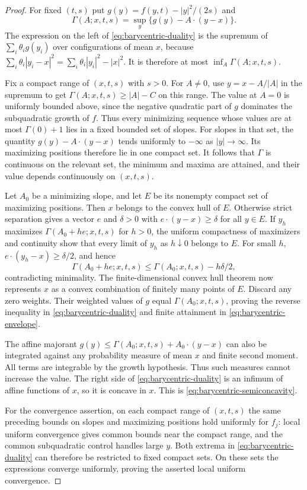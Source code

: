 \documentclass[11pt]{article}
\numberwithin{equation}{section}
\theoremstyle{definition}
\theoremstyle{remark}
\begin{document}
\begin{proof}
For fixed $(t,s)$ put $g(y)=f(y,t)-|y|^2/(2s)$ and
\[
  \Gamma(A;x,t,s)=\sup_y\{g(y)-A\cdot(y-x)\}.
\]
The expression on the left of \eqref{eq:barycentric-duality}
is the supremum of $\sum_i\theta_i g(y_i)$ over configurations
of mean $x$, because
$\sum_i\theta_i|y_i-x|^2=\sum_i\theta_i|y_i|^2-|x|^2$.
It is therefore at most $\inf_A\Gamma(A;x,t,s)$.

Fix a compact range of $(x,t,s)$ with $s>0$. For $A\ne0$, use
$y=x-A/|A|$ in the supremum to get
$\Gamma(A;x,t,s)\ge |A|-C$ on this range. The value at $A=0$
is uniformly bounded above, since the negative quadratic part
of $g$ dominates the subquadratic growth of $f$. Thus every
minimizing sequence whose values are at most $\Gamma(0)+1$
lies in a fixed bounded set of slopes.
For slopes in that set, the quantity
$g(y)-A\cdot(y-x)$ tends uniformly to $-\infty$ as
$|y|\to\infty$. Its maximizing positions therefore lie in one
compact set. It follows that $\Gamma$ is continuous on the
relevant set, the minimum and maxima are attained, and their
value depends continuously on $(x,t,s)$.

Let $A_0$ be a minimizing slope, and let $E$ be its nonempty
compact set of maximizing positions. Then $x$ belongs to the
convex hull of $E$. Otherwise strict separation gives a vector
$e$ and $\delta>0$ with
$e\cdot(y-x)\ge\delta$ for all $y\in E$. If $y_h$ maximizes
$\Gamma(A_0+he;x,t,s)$ for $h>0$, the uniform compactness of
maximizers and continuity show that every limit of $y_h$ as
$h\downarrow0$ belongs to $E$. For small $h$,
$e\cdot(y_h-x)\ge\delta/2$, and hence
\[
  \Gamma(A_0+he;x,t,s)
   \le\Gamma(A_0;x,t,s)-h\delta/2,
\]
contradicting minimality. The finite-dimensional convex hull
theorem now represents $x$ as a convex combination of finitely
many points of $E$. Discard any zero weights. Their weighted
values of $g$ equal $\Gamma(A_0;x,t,s)$, proving the reverse
inequality in \eqref{eq:barycentric-duality} and finite
attainment in \eqref{eq:barycentric-envelope}.

The affine majorant
$g(y)\le\Gamma(A_0;x,t,s)+A_0\cdot(y-x)$ can also be
integrated against any probability measure of mean $x$ and
finite second moment. All terms are integrable by the growth
hypothesis. Thus such measures cannot increase the value.
The right side of \eqref{eq:barycentric-duality} is an infimum
of affine functions of $x$, so it is concave in $x$. This is
\eqref{eq:barycentric-semiconcavity}.

For the convergence assertion, on each compact range of
$(x,t,s)$ the same preceding bounds on slopes and maximizing
positions hold uniformly for $f_j$: local uniform convergence
gives common bounds near the compact range, and the common
subquadratic control handles large $y$. Both extrema in
\eqref{eq:barycentric-duality} can therefore be restricted to
fixed compact sets. On these sets the expressions converge
uniformly, proving the asserted local uniform convergence.
\end{proof}
\end{document}
